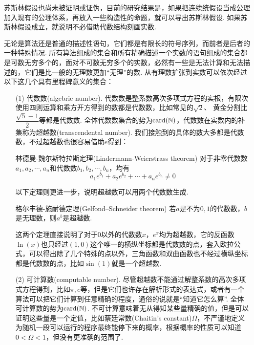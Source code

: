 \documentclass[main.tex]{subfiles}
\begin{document}
苏斯林假设也尚未被证明或证伪，目前的研究结果是，如果把连续统假设当成公理加入现有的公理体系，再放入一些构造性的命题，就可以导出苏斯林假设. 如果苏斯林假设成立，就说明不必借助代数结构刻画实数.

\vspace{1cm}

无论是算法还是普通的描述性语句，它们都是有限长的符号序列，而前者是后者的一种特殊情况. 所有算法组成的集合和所有精确描述一个实数的语句组成的集合都是可数无穷多个的，面对不可数无穷多个的实数，必然有一些是无法计算和无法描述的，它们是比一般的无理数更加“无理”的数. 从有理数扩张到实数可以依次经过以下这几个具有里程碑意义的集合：
\begin{itemize}
    \item [(1)]
    代数数(algebric number). 代数数是整系数高次多项式方程的实根，有限次使用四则运算和乘方开方得到的数都是代数数，比如常见的\(\sqrt2\)、 黄金分割比\(\dfrac{\sqrt{5}-1}{2}\)等都是代数数. 全体代数数集合的势为\({\rm card}(\mathbb{N})\)，代数数在实数内的补集称为超越数(transcendental number). 我们接触到的具体的数大多都是代数数，不过超越数也很容易借助\(e\)得到：
    \begin{theorem}{林德曼-魏尔斯特拉斯定理(Lindermann-Weierstrass theorem)}
        对于非零代数数\(a_1, a_2, \cdots, a_n\)和代数数\(b_1, b_2, \cdots, b_n\)，均有
        \[a_1e^{b_1}+a_2e^{b_2}+\cdots+a_ne^{b_n} \neq 0\]
    \end{theorem}
    以下定理则更进一步，说明超越数可以用两个代数数生成.
    \begin{theorem}{格尔丰德-施耐德定理(Gelfond–Schneider theorem)}
        若\(a\)是不为\(0,1\)的代数数，\(b\)是无理数，则\(a^b\)是超越数.
    \end{theorem}
    这两个定理直接说明了对于\(0\)以外的代数数\(x\)，\(e^x\)均为超越数，它的反函数\(\ln(x)\)也只经过\((1,0)\)这个唯一的横纵坐标都是代数数的点，套入欧拉公式，可以得出除了几个特殊的点以外，三角函数和双曲函数也不经过横纵坐标都是代数数的点，比如\(\sin(1)\)就是一个超越数.
\end{itemize}
\begin{itemize}
    \item[(2)]
    可计算数(computable number). 尽管超越数不能通过解整系数的高次多项式方程得到，比如\(\pi, e\)等，但是它们也许存在解析形式的表达式，或者有一个算法可以把它们计算到任意精确的程度，通俗的说就是“知道它怎么算”. 全体可计算数的势为\({\rm card}(\mathbb{N})\). 不可计算意味着无从得知某些量精确的值，但是可以证明这些量是一个定值，比如蔡廷常数(Chaitin's constant)\(\Omega\)，不严谨地定义为随机一段可以运行的程序最终能停下来的概率，根据概率的性质可以知道\(0<\Omega<1\)，但没有更准确的范围了.
\end{itemize}
\end{document}
